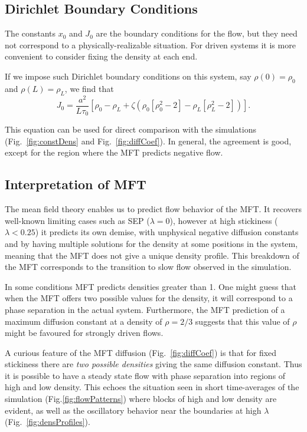 \documentclass[
reprint, amsmath,amssymb,
]{revtex4-1}
\begin{document}
\subsection{Dirichlet Boundary Conditions}

The constants $x_0$ and $J_0$ are the boundary conditions for the
flow, but they need not correspond to a physically-realizable
situation.  For driven systems it is more convenient to consider fixing
the density at each end. 

If we impose such Dirichlet boundary conditions on this system, say
$\rho(0)=\rho_0$ and $\rho(L)=\rho_L$, we find that
\begin{equation}\label{eq:MFTflow}
 J_0 = \frac{a^2}{L \tau_0} \left[ \rho_0 - \rho_L + \zeta \left( \rho_0\left[\rho_0^2-2\right] - \rho_L\left[\rho_L^2-2\right] \right) \right].
\end{equation}

This equation can be used for direct comparison with the simulations
(Fig.~\ref{fig:constDens} and Fig.~\ref{fig:diffCoef}).  In general, the agreement is
good, except for the region where the MFT predicts negative flow.


\subsection{Interpretation of MFT}

The mean field theory enables us to predict flow behavior of the MFT.
It recovers well-known limiting cases such as SEP ($\lambda=0$),
however at high stickiness ($\lambda<0.25$) it predicts its own
demise, with unphysical negative diffusion constants and by having
multiple solutions for the density at some positions in the system,
meaning that the MFT does not give a unique density
profile.  This breakdown of the MFT corresponds to the transition to
slow flow observed in the simulation.

In some
conditions MFT predicts densities greater than 1.  One might guess that when the
MFT offers two possible values for the density, it will correspond to
a phase separation in the actual system. Furthermore,
the MFT prediction of a maximum diffusion constant at a density of
$\rho=2/3$ suggests that this value of $\rho$ might be favoured for
strongly driven flows.

A curious feature of the MFT diffusion (Fig.~\ref{fig:diffCoef}) is
that for fixed stickiness there are {\it two possible densities}
giving the same diffusion constant.  Thus it is possible to have a
steady state flow with phase separation into regions of high and low
density. This echoes the situation seen in short time-averages of the
simulation (Fig.\ref{fig:flowPatterns}) where blocks of high and low
density are evident, as well as the oscillatory behavior near the boundaries at high $\lambda$ (Fig.~\ref{fig:densProfiles}). 
\end{document}
